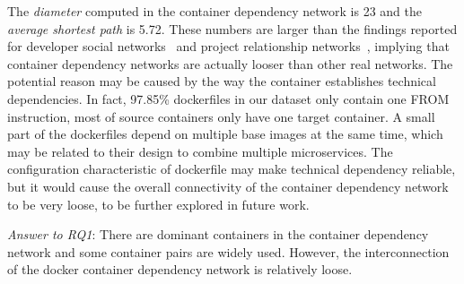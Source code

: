 \documentclass[sigconf]{acmart}
\begin{document}
The \emph{diameter} computed in the container dependency network is 23 and the \emph{average shortest path} is 5.72. These numbers are larger than the findings reported for developer social networks~\cite{zhang2017social} and project relationship networks~\cite{thung2013network},   
implying that container dependency networks are actually looser than other real networks. 
The potential reason may be caused by the way the container establishes technical dependencies. 
In fact, 97.85\% dockerfiles in our dataset only contain one FROM instruction, most of source containers only have one target container. A small part of the dockerfiles depend on multiple base images at the same time, which may be related to their design to combine multiple microservices. 
The configuration characteristic of dockerfile may make technical dependency reliable, but it would cause the overall connectivity of the container dependency network to be very loose,
to be further explored in future work.

\begin{mybox}
\emph{Answer to RQ1}: There are dominant containers in the container dependency network and some container pairs are widely used. However, the interconnection of the docker container dependency network is relatively loose. 
\end{mybox}
\end{document}
